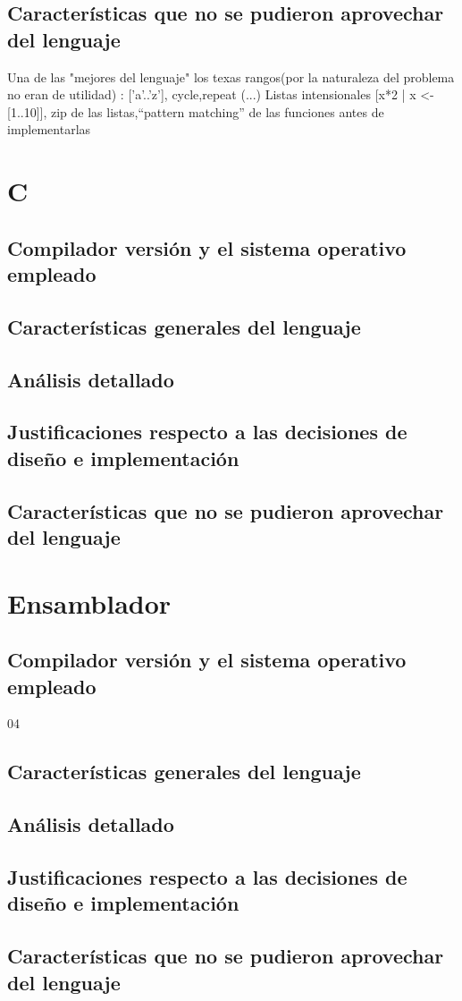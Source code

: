 \documentclass[12pt,a4paper]{article}
\begin{document}
       \subsection{Características que no se pudieron aprovechar del lenguaje}
       Una de las "mejores del lenguaje" los texas rangos(por la naturaleza del problema no eran de utilidad) : ['a'..'z'], cycle,repeat (...) Listas intensionales [x*2 | x <- [1..10]], zip de las listas,“pattern matching” de las funciones antes de implementarlas
      \section{C}
       \subsection{Compilador versión y el sistema operativo empleado}
        \subsection{Características generales del lenguaje}
        \subsection{Análisis detallado}
        \subsection{Justificaciones respecto a las decisiones de diseño e implementación}
        \subsection{Características que no se pudieron aprovechar del lenguaje}
          \section{Ensamblador}
           \subsection{Compilador versión y el sistema operativo empleado}04
            \subsection{Características generales del lenguaje}
            \subsection{Análisis detallado}
            \subsection{Justificaciones respecto a las decisiones de diseño e implementación}
            \subsection{Características que no se pudieron aprovechar del lenguaje}
\end{document}
